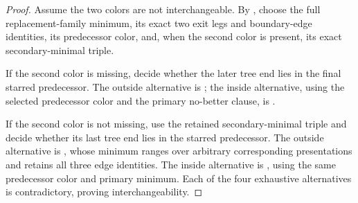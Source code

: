 \begin{proof}
Assume the two colors are not interchangeable.  By , choose the full replacement-family minimum, its exact two exit legs and boundary-edge identities, its predecessor color, and, when the second color is present, its exact secondary-minimal triple.

If the second color is missing, decide whether the later tree end lies in the final starred predecessor.  The outside alternative is ; the inside alternative, using the selected predecessor color and the primary no-better clause, is .

If the second color is not missing, use the retained secondary-minimal triple and decide whether its last tree end lies in the starred predecessor.  The outside alternative is , whose minimum ranges over arbitrary corresponding presentations and retains all three edge identities.  The inside alternative is , using the same predecessor color and primary minimum.  Each of the four exhaustive alternatives is contradictory, proving interchangeability.
\end{proof}

